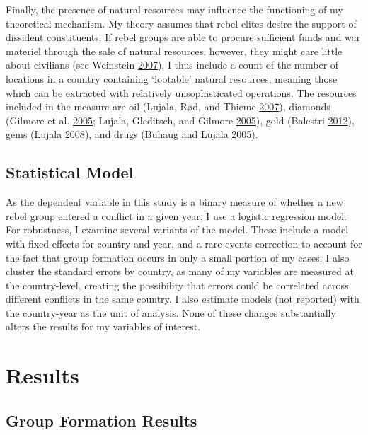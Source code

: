 \documentclass[12pt,]{book}
\theoremstyle{definition}
\theoremstyle{definition}
\theoremstyle{remark}
\begin{document}
Finally, the presence of natural resources may influence the functioning
of my theoretical mechanism. My theory assumes that rebel elites desire
the support of dissident constituents. If rebel groups are able to
procure sufficient funds and war materiel through the sale of natural
resources, however, they might care little about civilians (see
Weinstein \protect\hyperlink{ref-Weinstein2007}{2007}). I thus include a
count of the number of locations in a country containing `lootable'
natural resources, meaning those which can be extracted with relatively
unsophisticated operations. The resources included in the measure are
oil (Lujala, Rød, and Thieme \protect\hyperlink{ref-Lujala2007}{2007}),
diamonds (Gilmore et al. \protect\hyperlink{ref-Gilmore2007}{2005};
Lujala, Gleditsch, and Gilmore
\protect\hyperlink{ref-Lujala2005}{2005}), gold (Balestri
\protect\hyperlink{ref-Balestri2012}{2012}), gems (Lujala
\protect\hyperlink{ref-Lujala2008}{2008}), and drugs (Buhaug and Lujala
\protect\hyperlink{ref-Buhaug2005}{2005}).

\subsection{Statistical Model}\label{statistical-model}

As the dependent variable in this study is a binary measure of whether a
new rebel group entered a conflict in a given year, I use a logistic
regression model. For robustness, I examine several variants of the
model. These include a model with fixed effects for country and year,
and a rare-events correction to account for the fact that group
formation occurs in only a small portion of my cases. I also cluster the
standard errors by country, as many of my variables are measured at the
country-level, creating the possibility that errors could be correlated
across different conflicts in the same country. I also estimate models
(not reported) with the country-year as the unit of analysis. None of
these changes substantially alters the results for my variables of
interest.

\section{Results}\label{results}

\subsection{Group Formation Results}\label{group-formation-results}
\end{document}
